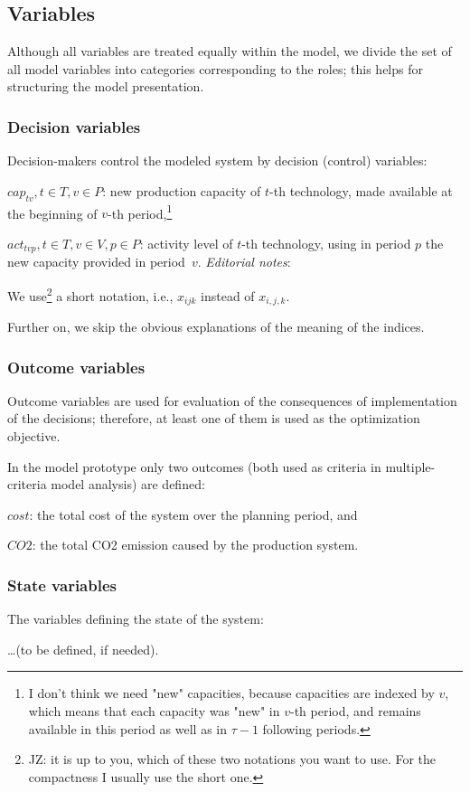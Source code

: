 \documentclass[a4paper,12pt]{article}
\begin{document}
\subsection{Variables}
Although all variables are treated equally within the model,
we divide the set of all model variables into categories corresponding to the roles;
this helps for structuring the model presentation.

\subsubsection{Decision variables}
Decision-makers control the modeled system by decision (control) variables:
\btlb
\item $cap_{tv}, t \in T, v \in P$: new production capacity of $t$-th
	technology, made available at the beginning of $v$-th period,\footnote{
	I don't think we need "new" capacities, because capacities are indexed
	by $v$, which means that each capacity was "new" in $v$-th period, and
	remains available in this period as well as in $\tau - 1$ following periods.}
\item $act_{tvp}, t \in T, v \in V, p \in P$: activity level of $t$-th
	technology, using in period $p$ the new capacity provided in period~$v$.
\etl
{\em Editorial notes}:
\btlb
\item We use\footnote{JZ: it is up to you, which of these two notations
	you want to use. For the compactness I usually use the short one.}
	a short notation, i.e., $x_{ijk}$ instead of $x_{i,j,k}$.
\item Further on, we skip the obvious explanations of the meaning of the indices.
\etl

\subsubsection{Outcome variables}
Outcome variables are used for evaluation of the consequences of implementation
of the decisions; therefore, at least one of them is used as the optimization
objective.

In the model prototype only two outcomes (both used as criteria in
multiple-criteria model analysis) are defined:
\btlb
\item $cost$: the total cost of the system over the planning period, and
\item $CO2$: the total CO2 emission caused by the production system.
\etl

\subsubsection{State variables}
The variables defining the state of the system:
\btlb
\item \dots (to be defined, if needed).
\etl
\end{document}
